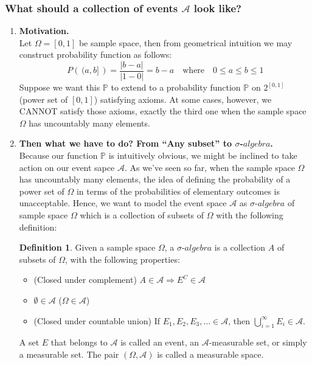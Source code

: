 \documentclass[twoside]{article}
\theoremstyle{definition}
\newtheorem{definition}{Definition}[section]
\theoremstyle{remark}
\begin{document}
\subsubsection{What should a collection of events $\mathcal{A}$ look like?}
\begin{enumerate}
\setlength\itemsep{1.0em}
\item
\textbf{Motivation.}
\\[1.0\baselineskip]
Let $\Omega = [0, 1]$ be sample space, then from geometrical intuition we may
construct probability function as follows:
$$
P\left( \,(a,b]\, \right) = \frac{|b - a|}{|1 - 0|} = b - a
\quad \textrm{where} \quad 0 \leq a \leq b \leq 1
$$
Suppose we want this $\mathbb{P}$ to extend to a probability function $\mathbb{P}$
on $2^{[0, 1]}$ (power set of $[0, 1]$) satisfying axioms. At some cases, however,
we CANNOT satisfy those axioms, exactly the third one when the sample space
$\Omega$ has uncountably many elements.

\item
\textbf{Then what we have to do? From ``Any subset'' to $\sigma$-$algebra$.}
\\[1.0\baselineskip]
Because our function $\mathbb{P}$ is intuitively obvious, we might be inclined
to take action on our event sapce $\mathcal{A}$. As we've seen so far, when the
sample space $\Omega$ has uncountably many elements, the idea of defining the
probability of a power set of $\Omega$ in terms of the probabilities of
elementary outcomes is unacceptable. Hence, we want to model the event space
$\mathcal{A}$ as $\sigma$-$algebra$ of sample space $\Omega$ which is a
collection of subsets of $\Omega$ with the following definition:

\begin{definition}
  Given a sample space $\Omega$, a $\sigma$-$algebra$ is a collection $A$ of
  subsets of $\Omega$, with the following properties:
  \begin{itemize}
    \item (Closed under complement)
          $A \in \mathcal{A} \Rightarrow E^C \in \mathcal{A}$
    \item $\emptyset \in \mathcal{A}$ ($\Omega \in \mathcal{A}$)
    \item (Closed under countable union)
          If $E_1, E_2, E_3, \ldots \in \mathcal{A}$,
          then $\bigcup_{i=1}^{\infty} E_i \in \mathcal{A}$.
  \end{itemize}
  A set $E$ that belongs to $\mathcal{A}$ is called an event, an
  $\mathcal{A}$-measurable set, or simply a measurable set. The pair
  $(\Omega, \mathcal{A})$ is called a measurable space.
\end{definition}


\end{enumerate}
\end{document}
